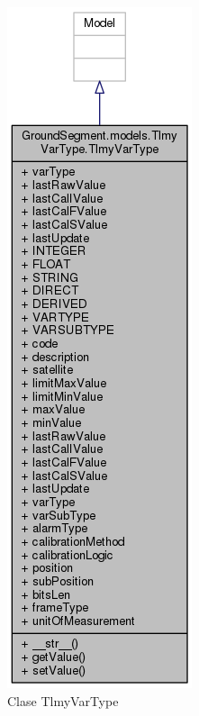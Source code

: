 \documentclass[twoside,twocolumn]{article}
\begin{document}
{{\begin{figure}[!htb]
    \centering
    \begin{minipage}{0.2\textwidth}
        \centering
        \includegraphics[width=0.5\linewidth]{Imagenes/TelemetryVarType.png}
        \caption{Clase TlmyVarType}
        \label{fig:prob1_6_2}
    \end{minipage}%
    \begin{minipage}{0.2\textwidth}

\end{minipage}
\end{figure}}}
\end{document}
